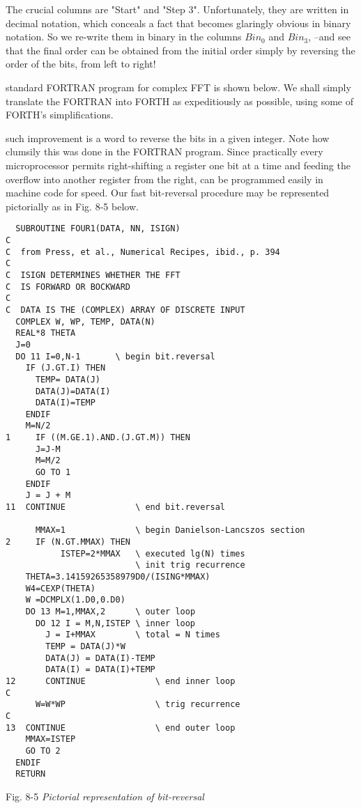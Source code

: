The crucial columns are "Start" and "Step 3". Unfortunately, they are written in decimal notation, which conceals a fact that becomes glaringly obvious in binary notation. So we re-write them in binary in the columns $Bin_0$ and $Bin_3$, --and see that the final order can be obtained from the initial order simply by reversing the order of the bits, from left to right!

 standard FORTRAN program for complex FFT is shown below. We shall simply translate the FORTRAN into FORTH as expeditiously as possible, using some of FORTH's simplifications.

 such improvement is a word to reverse the bits in a given integer. Note how clumsily this was done in the FORTRAN program. Since practically every microprocessor permits right-shifting a register one bit at a time and feeding the overflow into another register from the right,  can be programmed easily in machine code for speed. Our fast bit-reversal procedure  may be represented pictorially as in Fig. 8-5 below.

\begin{verbatim}
  SUBROUTINE FOUR1(DATA, NN, ISIGN)
C
C  from Press, et al., Numerical Recipes, ibid., p. 394
C   
C  ISIGN DETERMINES WHETHER THE FFT
C  IS FORWARD OR BOCKWARD
C
C  DATA IS THE (COMPLEX) ARRAY OF DISCRETE INPUT 
  COMPLEX W, WP, TEMP, DATA(N)
  REAL*8 THETA
  J=0
  DO 11 I=0,N-1       \ begin bit.reversal
    IF (J.GT.I) THEN
      TEMP= DATA(J)
      DATA(J)=DATA(I)
      DATA(I)=TEMP
    ENDIF
    M=N/2
1     IF ((M.GE.1).AND.(J.GT.M)) THEN
      J=J-M
      M=M/2
      GO TO 1
    ENDIF
    J = J + M
11  CONTINUE              \ end bit.reversal
      
      MMAX=1              \ begin Danielson-Lancszos section
2     IF (N.GT.MMAX) THEN
           ISTEP=2*MMAX   \ executed lg(N) times
                          \ init trig recurrence
    THETA=3.14159265358979D0/(ISING*MMAX)
    W4=CEXP(THETA)
    W =DCMPLX(1.D0,0.D0)
    DO 13 M=1,MMAX,2      \ outer loop
      DO 12 I = M,N,ISTEP \ inner loop
        J = I+MMAX        \ total = N times
        TEMP = DATA(J)*W
        DATA(J) = DATA(I)-TEMP
        DATA(I) = DATA(I)+TEMP
12      CONTINUE              \ end inner loop
C
      W=W*WP                  \ trig recurrence
C
13  CONTINUE                  \ end outer loop
    MMAX=ISTEP
    GO TO 2
  ENDIF
  RETURN
\end{verbatim}

Fig. 8-5 \textit{Pictorial representation of bit-reversal}

